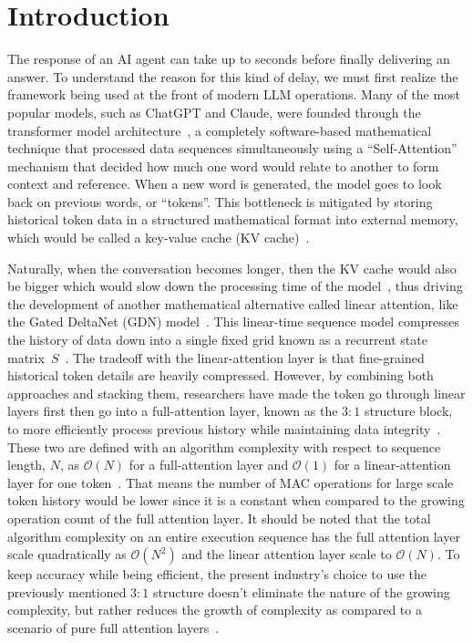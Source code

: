 \documentclass[conference]{IEEEtran}
\begin{document}
\section{Introduction}
The response of an AI agent can take up to seconds before finally delivering an answer. To understand the reason for this kind of delay, we must first realize the framework being used at the front of modern LLM operations. Many of the most popular models, such as ChatGPT and Claude, were founded through the transformer model architecture~\cite{b2}, a completely software-based mathematical technique that processed data sequences simultaneously using a ``Self-Attention'' mechanism that decided how much one word would relate to another to form context and reference. When a new word is generated, the model goes to look back on previous words, or ``tokens''. This bottleneck is mitigated by storing historical token data in a structured mathematical format into external memory, which would be called a key-value cache (KV cache)~\cite{b6}.

Naturally, when the conversation becomes longer, then the KV cache would also be bigger which would slow down the processing time of the model~\cite{b7}, thus driving the development of another mathematical alternative called linear attention, like the Gated DeltaNet (GDN) model~\cite{b3}. This linear-time sequence model compresses the history of data down into a single fixed grid known as a recurrent state matrix~$S$~\cite{b3}. The tradeoff with the linear-attention layer is that fine-grained historical token details are heavily compressed. However, by combining both approaches and stacking them, researchers have made the token go through linear layers first then go into a full-attention layer, known as the $3:1$ structure block, to more efficiently process previous history while maintaining data integrity~\cite{b9}. These two are defined with an algorithm complexity with respect to sequence length, $N$, as $\mathcal{O}(N)$ for a full-attention layer and $\mathcal{O}(1)$ for a linear-attention layer for one token~\cite{b3}. That means the number of MAC operations for large scale token history would be lower since it is a constant when compared to the growing operation count of the full attention layer. It should be noted that the total algorithm complexity on an entire execution sequence has the full attention layer scale quadratically as $\mathcal{O}(N^2)$ and the linear attention layer scale to $\mathcal{O}(N)$. To keep accuracy while being efficient, the present industry’s choice to use the previously mentioned $3:1$ structure doesn’t eliminate the nature of the growing complexity, but rather reduces the growth of complexity as compared to a scenario of pure full attention layers~\cite{b9}.
\end{document}

